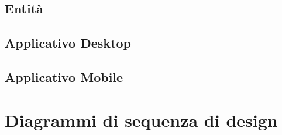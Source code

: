 \subsection{Entità}
    
     
    
    
    
\subsection{Applicativo Desktop} 
    
    
    
    
    
    
    
    
    
    
    
    
    \pagebreak
\subsection{Applicativo Mobile}
    
    
    
    
    
    
    
    
    
    
    
    
    
     
    
     
    
    

\section{Diagrammi di sequenza di design}

